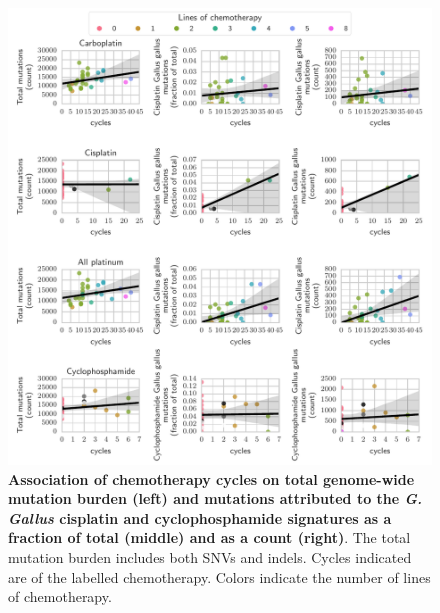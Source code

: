 \documentclass{article}
\begin{document}
\begin{figure}
\centering
\includegraphics[scale=1.0]{../figures/chemo_cycles_and_mutations.pdf}
\caption{\textbf{Association of chemotherapy cycles on total genome-wide mutation burden (left) and mutations attributed to the \textit{G. Gallus} cisplatin and cyclophosphamide signatures as a fraction of total (middle) and as a count (right)}. The total mutation burden includes both SNVs and indels. Cycles indicated are of the labelled chemotherapy. Colors indicate the number of lines of chemotherapy.}
\label{fig:supp_chemo_cycles_and_mutations}
\end{figure}
\end{document}
